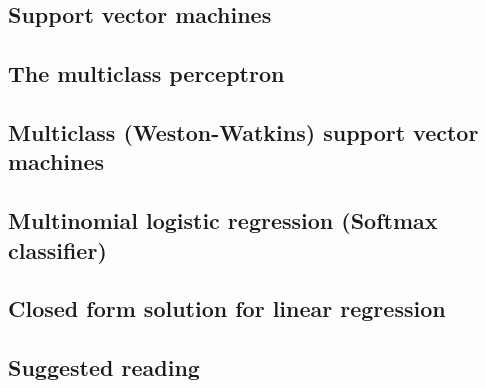 \subsection{Support vector machines}

\subsection{The multiclass perceptron}

\subsection{Multiclass (Weston-Watkins) support vector machines}

\subsection{Multinomial logistic regression (Softmax classifier)}

\subsection{Closed form solution for linear regression}


\subsection{Suggested reading}


